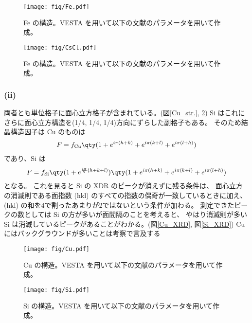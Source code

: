 \documentclass[11pt,dvipdfmx,a4paper]{jsarticle}
\begin{document}
\begin{figure}[H]
	\centering
	\begin{minipage}[t]{0.48\columnwidth}
		\centering
		\texttt{[image: fig/Fe.pdf]}
		\caption{Fe の構造。VESTA を用いて以下の文献のパラメータを用いて作成。\cite{cfi_Fe}}
		\label{Fe_str.}
	\end{minipage}
	\hfill
	\begin{minipage}[t]{0.48\columnwidth}
		\centering
		\texttt{[image: fig/CsCl.pdf]}
		\caption{Fe の構造。VESTA を用いて以下の文献のパラメータを用いて作成。\cite{cfi_CsCl}}
		\label{CsCl_str.}
	\end{minipage}
\end{figure}

\subsubsection*{(ii)}
両者とも単位格子に面心立方格子が含まれている。(図\ref{Cu_str.}, \ref{Si_str.})
Si はこれにさらに面心立方構造を(1/4, 1/4, 1/4)方向にずらした副格子もある。%
そのため結晶構造因子は Cu のものは
\begin{align}
	F = f_{\text{Cu}}\qty(1+e^{i\pi(h+k)}+e^{i\pi(k+l)}+e^{i\pi(l+h)})
\end{align}
であり、Si は
\begin{align}
	F = f_{\text{Si}}\qty(1+e^{\frac{i\pi}{2}(h+k+l)})\qty(1+e^{i\pi(h+k)}+e^{i\pi(k+l)}+e^{i\pi(l+h)})
\end{align}
となる。
これを見ると Si の XDR のピークが消えずに残る条件は、
面心立方の消滅則である面指数 (hkl) のすべての指数の偶奇が一致しているときに加え、
(hkl) の和を4で割ったあまりが2ではないという条件が加わる。
測定できたピークの数としては Si の方が多いが面間隔のことを考えると、
やはり消滅則が多い Si は消滅しているピークがあることがわかる。(図\ref{Cu_XRD}, 図\ref{Si_XRD})%
Cu にはバックグラウンドが多いことは考察で言及する\\ %
\begin{figure}[H]
	\centering
	\begin{minipage}[t]{0.48\columnwidth}
		\centering
		\texttt{[image: fig/Cu.pdf]}
		\caption{Cu の構造。VESTA を用いて以下の文献のパラメータを用いて作成。\cite{cfi_Cu}}
		\label{Cu_str.}
	\end{minipage}
	\hfill
	\begin{minipage}[t]{0.48\columnwidth}
		\centering
		\texttt{[image: fig/Si.pdf]}
		\caption{Si の構造。VESTA を用いて以下の文献のパラメータを用いて作成。\cite{cfi_Si}}
		\label{Si_str.}
	\end{minipage}
\end{figure}
\end{document}
